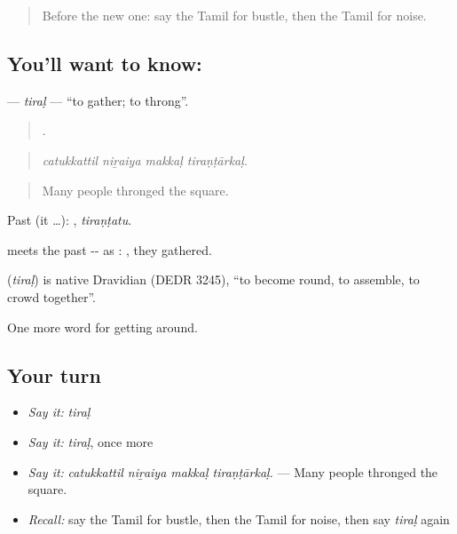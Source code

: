 \label{lesson:TA-C426-tiral}



\begin{quote}
Before the new one: say the Tamil for bustle, then the Tamil for noise.
\end{quote}

\subsection*{You'll want to know: }
\textbf{} — \emph{tiraḷ} — \textquotedblleft{}to gather; to throng\textquotedblright{}.

\begin{quote}
   .
\end{quote}

\begin{quote}
\emph{catukkattil niṟaiya makkaḷ tiraṇṭārkaḷ.}
\end{quote}

\begin{quote}
Many people thronged the square.
\end{quote}

Past (it …): , \emph{tiraṇṭatu}.

 meets the past -- as : , they gathered.

\begin{cousinweb}
\textbf{} (\emph{tiraḷ}) is native Dravidian (DEDR 3245), \textquotedblleft{}to become round, to assemble, to crowd together\textquotedblright{}.
\end{cousinweb}

\begin{grammarlens}[title={What you've built}]
One more word for getting around.
\end{grammarlens}

\subsection*{Your turn}
\begin{itemize}
\raggedright
  \item \emph{Say it:} \emph{tiraḷ}
  \item \emph{Say it:} \emph{tiraḷ}, once more
  \item \emph{Say it:} \emph{catukkattil niṟaiya makkaḷ tiraṇṭārkaḷ.} — Many people thronged the square.
  \item \emph{Recall:} say the Tamil for bustle, then the Tamil for noise, then say \emph{tiraḷ} again
\end{itemize}

